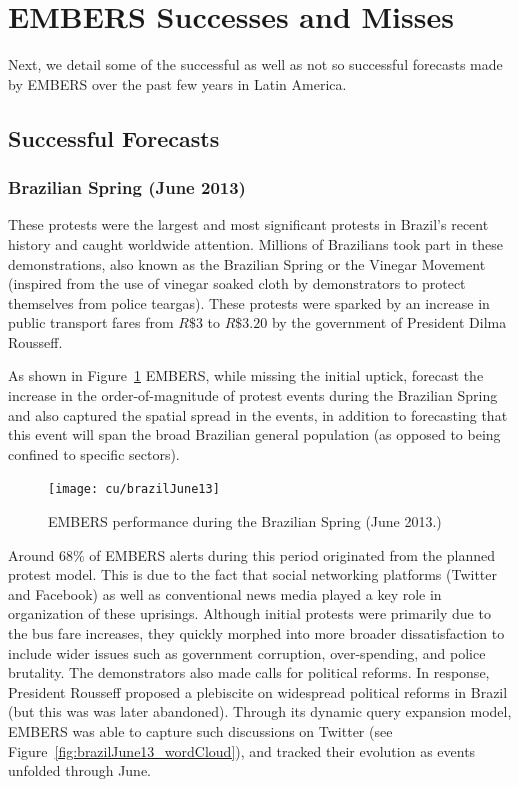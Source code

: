 \section{EMBERS Successes and Misses}
Next, we detail
some of the successful as well as not so successful forecasts made by EMBERS over
the past few years in Latin America.
\subsection{Successful Forecasts}
\subsubsection*{Brazilian Spring (June 2013)}
These protests were the largest and most
significant protests in Brazil's recent history and caught worldwide
attention. Millions of Brazilians took part in these demonstrations,
also known as the Brazilian Spring or the Vinegar Movement (inspired
from the use of vinegar soaked cloth by demonstrators to protect
themselves from police teargas). These protests were
sparked by an increase in public transport fares from $R\$3$
to $R\$3.20$ by the government of President Dilma Rousseff.

As shown in Figure~\ref{fig:brazilJune13} EMBERS, while missing the initial uptick,
forecast the increase in the order-of-magnitude of protest events
during the Brazilian Spring and also captured
the spatial spread in the events, in addition to forecasting that this event
will span the broad Brazilian general population (as opposed to being confined to
specific sectors).

\begin{figure}[H]
\centering
\texttt{[image: cu/brazilJune13]}
\caption{EMBERS performance during the Brazilian Spring (June 2013.)}
\label{fig:brazilJune13}
\end{figure}

Around 68\% of EMBERS alerts during this period originated from
the planned protest model.
This is due to the fact that
social networking
platforms (Twitter and Facebook) as well as conventional news media played a key
role in organization of these uprisings. Although initial protests were
primarily due to the bus fare increases, they quickly morphed into
more broader dissatisfaction to include wider issues such as
government corruption, over-spending, and police brutality. The
demonstrators also made calls for political reforms. In response, President
Rousseff proposed a plebiscite on widespread political reforms in
Brazil (but this was was later abandoned). Through its dynamic query expansion model,
EMBERS was able to capture such discussions on Twitter
(see Figure~\ref{fig:brazilJune13_wordCloud}), and tracked their evolution as events
unfolded through June.

